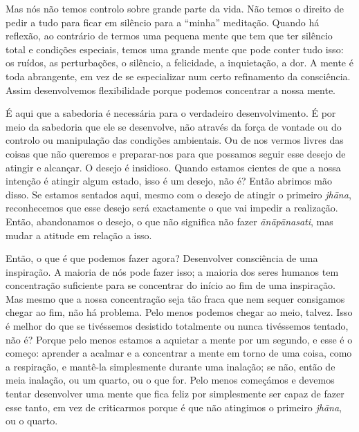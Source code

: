 Mas nós não temos controlo sobre grande parte da vida. Não temos o direito de
pedir a tudo para ficar em silêncio para a ``minha'' meditação. Quando há
reflexão, ao contrário de termos uma pequena mente que tem que ter silêncio
total e condições especiais, temos uma grande mente que pode conter tudo isso:
os ruídos, as perturbações, o silêncio, a felicidade, a inquietação, a dor. A
mente é toda abrangente, em vez de se especializar num certo refinamento da
consciência. Assim desenvolvemos flexibilidade porque podemos concentrar a nossa
mente.

É aqui que a sabedoria é necessária para o verdadeiro desenvolvimento. É por
meio da sabedoria que ele se desenvolve, não através da força de vontade ou do
controlo ou manipulação das condições ambientais. Ou de nos vermos livres das
coisas que não queremos e preparar-nos para que possamos seguir esse desejo de
atingir e alcançar. O desejo é insidioso. Quando estamos cientes de que a nossa
intenção é atingir algum estado, isso é um desejo, não é? Então abrimos mão
disso. Se estamos sentados aqui, mesmo com o desejo de atingir o primeiro
\emph{jhāna}, reconhecemos que esse desejo será exactamente o que vai impedir a
realização. Então, abandonamos o desejo, o que não significa não fazer
\emph{ānāpānasati}, mas mudar a atitude em relação a isso.

Então, o que é que podemos fazer agora? Desenvolver consciência de uma
inspiração. A maioria de nós pode fazer isso; a maioria dos seres humanos tem
concentração suficiente para se concentrar do início ao fim de uma inspiração.
Mas mesmo que a nossa concentração seja tão fraca que nem sequer consigamos
chegar ao fim, não há problema. Pelo menos podemos chegar ao meio, talvez. Isso
é melhor do que se tivéssemos desistido totalmente ou nunca tivéssemos tentado,
não é? Porque pelo menos estamos a aquietar a mente por um segundo, e esse é o
começo: aprender a acalmar e a concentrar a mente em torno de uma coisa, como a
respiração, e mantê-la simplesmente durante uma inalação; se não, então de meia
inalação, ou um quarto, ou o que for. Pelo menos começámos e devemos tentar
desenvolver uma mente que fica feliz por simplesmente ser capaz de fazer esse
tanto, em vez de criticarmos porque é que não atingimos o primeiro \emph{jhāna},
ou o quarto.

